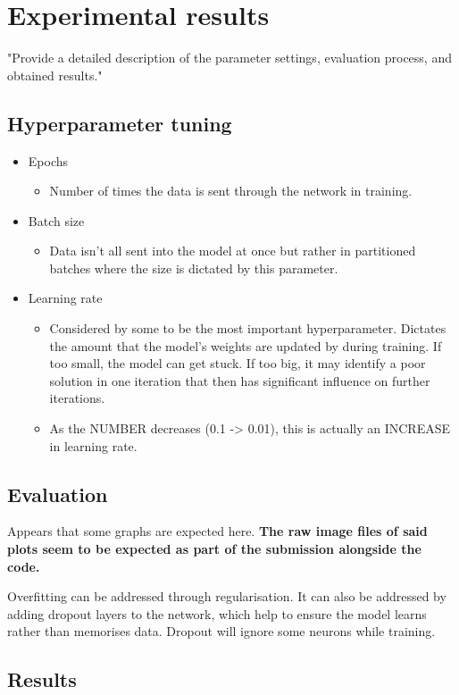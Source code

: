 \chapter{Experimental results}
"Provide a detailed description of the
parameter settings, evaluation process, and obtained results."

\section{Hyperparameter tuning}

\begin{itemize}
    \item Epochs \begin{itemize}
        \item Number of times the data is sent through the network in training.
    \end{itemize}
    \item Batch size \begin{itemize}
        \item Data isn't all sent into the model at once but rather in partitioned batches 
        where the size is dictated by this parameter.
    \end{itemize}
    \item Learning rate \begin{itemize}
        \item Considered by some to be the most important hyperparameter. Dictates the 
        amount that the model's weights are updated by during training. If too small,
        the model can get stuck. If too big, it may identify a poor solution in one 
        iteration that then has significant influence on further iterations.
        \item As the NUMBER decreases (0.1 -> 0.01), this is actually an INCREASE 
        in learning rate.
    \end{itemize}
    
\end{itemize}


\section{Evaluation}
Appears that some graphs are expected here. \textbf{The raw image files of said plots seem to be 
expected as part of the submission alongside the code.}

Overfitting can be addressed through regularisation. It can also be addressed by adding dropout layers 
to the network, which help to ensure the model learns rather than memorises data. Dropout will ignore some 
neurons while training.

\section{Results}
